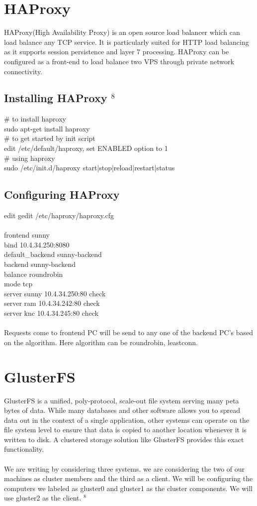 \documentclass[12pt]{report}
\begin{document}
\section{HAProxy}
HAProxy(High Availability Proxy) is an open source load balancer which can load balance any TCP service. It is particularly suited for HTTP load balancing as it supports session persistence and layer 7 processing. HAProxy can be configured as a front-end to load balance two VPS through private network connectivity.\\
\subsection{Installing HAProxy $ ^{8}$}
\# to install haproxy\\
sudo apt-get install haproxy\\
\# to get started by init script\\
edit /etc/default/haproxy, set ENABLED option to 1\\
\# using haproxy\\
sudo /etc/init.d/haproxy {start|stop|reload|restart|status}\\
\subsection{Configuring HAProxy}
edit gedit /etc/haproxy/haproxy.cfg\\
\\
frontend sunny\\
   bind 10.4.34.250:8080\\
   default\_backend sunny-backend\\
backend sunny-backend\\
   balance roundrobin\\
   mode tcp\\
   server sunny 10.4.34.250:80 check\\
   server ram 10.4.34.242:80 check\\
   server knc 10.4.34.245:80 check\\
\\
Requests come to frontend PC will be send to any one of the backend PC's based on the algorithm. Here algorithm can be roundrobin, leastconn.\\

\pagebreak
\section{GlusterFS}
	GlusterFS is a unified, poly-protocol, scale-out file system serving many peta bytes of data. While many databases and other software allows you to spread data out in the context of a single application, other systems can operate on the file system level to ensure that data is copied to another location whenever it is written to disk. A clustered storage solution like GlusterFS provides this exact functionality.\\
\\
	We are writing by considering three systems. we are considering the two of our machines as cluster members and the third as a client. We will be configuring the computers we labeled as gluster0 and gluster1 as the cluster components. We will use gluster2 as the client. $ ^{8}$
\end{document}
